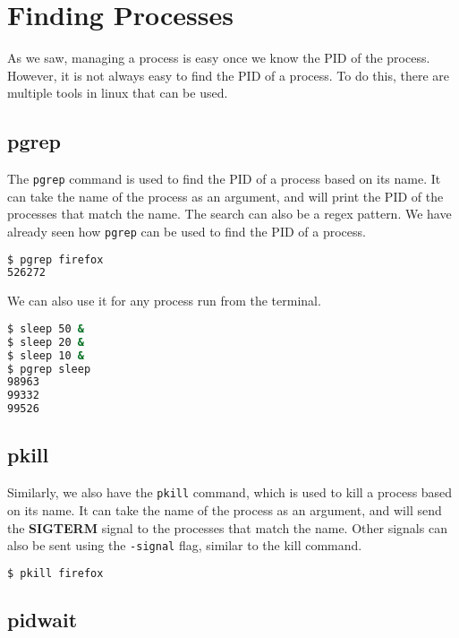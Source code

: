 \vfill
\pagebreak
\section{Finding Processes}

As we saw, managing a process is easy once we know the PID of the process.
However, it is not always easy to find the PID of a process.
To do this, there are multiple tools in linux that can be used.

\subsection{pgrep}

The \lstinline|pgrep| command is used to find the PID of a process based on its name.
It can take the name of the process as an argument, and will print the PID of the
processes that match the name. The search can also be a regex pattern.
We have already seen how \lstinline|pgrep| can be used to find the PID of a process.

\begin{lstlisting}[language=bash]
$ pgrep firefox
526272
\end{lstlisting}

We can also use it for any process run from the terminal.

\begin{lstlisting}[language=bash]
$ sleep 50 &
$ sleep 20 &
$ sleep 10 &
$ pgrep sleep
98963
99332
99526
\end{lstlisting}

\subsection{pkill}

Similarly, we also have the \lstinline|pkill| command, which is used to kill a process
based on its name. It can take the name of the process as an argument, and will
send the \textbf{SIGTERM} signal to the processes that match the name.
Other signals can also be sent using the \lstinline|-signal| flag, similar to the
kill command.

\begin{lstlisting}[language=bash]
$ pkill firefox
\end{lstlisting}

\subsection{pidwait}

